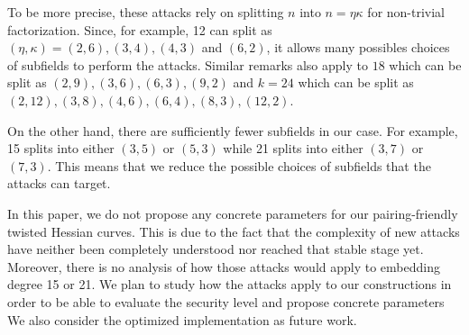 To be more precise, these attacks rely on splitting $n$ into $n = \eta \kappa$ for non-trivial factorization.
Since, for example, 12 can split as $(\eta,\kappa) = (2,6), (3,4), (4,3)$ and $(6,2)$,
it allows many possibles choices of subfields to perform the attacks.
Similar remarks also apply to
$18$ which can be split as $(2,9), (3,6), (6,3), (9,2)$
and
$k = 24$ which can be split as $(2,12), (3,8), (4,6), (6,4), (8,3), (12,2)$.

On the other hand, there are sufficiently fewer subfields in our case.
For example, 15 splits into either $(3,5)$ or $(5,3)$
while 21 splits into either $(3,7)$ or $(7,3)$.
This means that we reduce the possible choices of subfields that the attacks can target.

In this paper, we do not propose any concrete parameters for our pairing-friendly twisted Hessian curves.
This is due to the fact that the complexity of new attacks have neither been completely understood nor reached that stable stage yet.
Moreover, there is no analysis of how those attacks would apply to embedding degree 15 or 21.
We plan to study how the attacks apply to our constructions in order to be able to
evaluate the security level and propose concrete parameters
We also consider the optimized implementation as future work.
